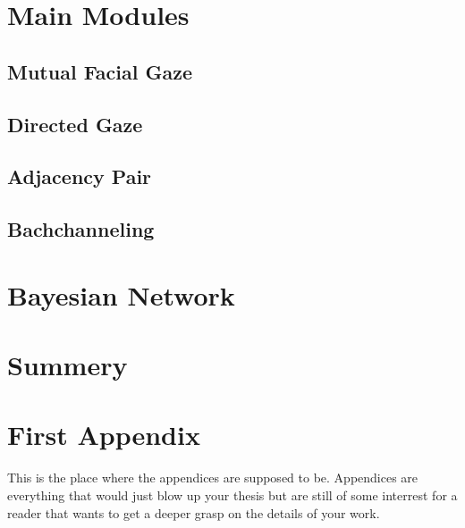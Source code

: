 \documentclass[12pt, a4paper, fleqn]{memoir}%
\begin{document}
\chapter{Main Modules}
\label{chap:MainModules}

\section{Mutual Facial Gaze}
\label{sec:MutualFacialGaze}

\section{Directed Gaze}
\label{sec:DirectedGaze}

\section{Adjacency Pair}
\label{sec:AdjacencyPair}

\section{Bachchanneling}
\label{sec:Bachchanneling}

\chapter{Bayesian Network}
\label{chap:BayesianNetwork}

\chapter{Summery}
\label{Summery}


{\small}

\appendix
\appendixpage*
\chapter{First Appendix}
\label{app:FirstAppendix}
This is the place where the appendices are supposed to be. Appendices are everything that would just blow up your thesis but are still of some interrest for a reader that wants to get a deeper grasp on the details of your work.
\end{document}
